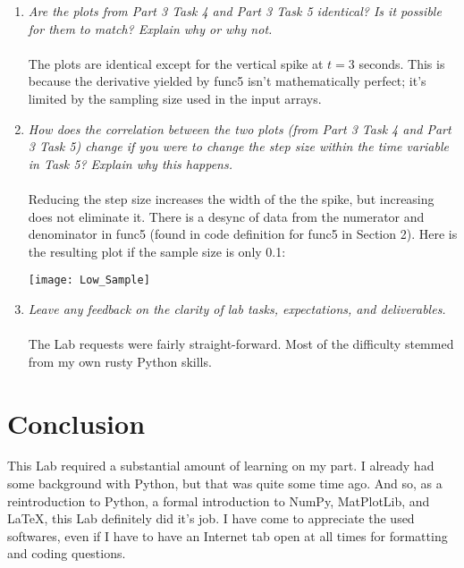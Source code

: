 \documentclass[12pt]{report}
\begin{document}
\begin{enumerate}
    \item \textit{Are the plots from Part 3 Task 4 and Part 3 Task 5 identical? Is it possible for them to match? Explain why or why not.} \\ \\ The plots are identical except for the vertical spike at $t=3$ seconds. This is because the derivative yielded by func5 isn't mathematically perfect; it's limited by the sampling size used in the input arrays.
    \item \textit{How does the correlation between the two plots (from Part 3 Task 4 and Part 3 Task 5) change if you were to change the step size within the time variable in Task 5? Explain why this happens.} \\ \\ Reducing the step size increases the width of the the spike, but increasing does not eliminate it. There is a desync of data from the numerator and denominator in func5 (found in code definition for func5 in Section 2). Here is the resulting plot if the sample size is only 0.1: \\
    \begin{center}
        \texttt{[image: Low\_Sample]}
    \end{center}
    \item \textit{Leave any feedback on the clarity of lab tasks, expectations, and deliverables.} \\ \\ The Lab requests were fairly straight-forward. Most of the difficulty stemmed from my own rusty Python skills.
\end{enumerate}
\pagebreak


\section{Conclusion}

This Lab required a substantial amount of learning on my part. I already had some background with Python, but that was quite some time ago. And so, as a reintroduction to Python, a formal introduction to NumPy, MatPlotLib, and \LaTeX, this Lab definitely did it's job. I have come to appreciate the used softwares, even if I have to have an Internet tab open at all times for formatting and coding questions.
\end{document}
